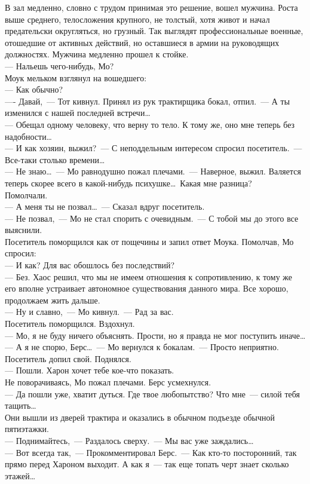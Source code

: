 В зал медленно, словно с трудом принимая это решение, вошел мужчина. Роста выше 
среднего, телосложения крупного, не толстый, хотя живот и начал предательски 
округляться, но грузный. Так выглядят профессиональные военные, отошедшие от 
активных действий, но оставшиеся в армии на руководящих должностях. Мужчина 
медленно прошел к стойке.\\
--- Нальешь чего-нибудь, Мо?\\
Моук мельком взглянул на вошедшего:\\
--- Как обычно?\\
---- Давай,~--- Тот кивнул. Принял из рук трактирщика бокал, отпил.~--- А ты 
изменился с нашей последней встречи\ldots\\
--- Обещал одному человеку, что верну то тело. К тому же, оно мне теперь без 
надобности\ldots\\
--- И как хозяин, выжил?~--- С неподдельным интересом спросил посетитель.~--- 
Все-таки столько времени\ldots\\
--- Не знаю\ldots~--- Мо равнодушно пожал плечами.~--- Наверное, выжил. Валяется 
теперь скорее всего в какой-нибудь психушке\ldots\ Какая мне разница?\\
Помолчали.\\
--- А меня ты не позвал\ldots~--- Сказал вдруг посетитель.\\
--- Не позвал,~--- Мо не стал спорить с очевидным.~--- С тобой мы до этого все 
выяснили.\\
Посетитель поморщился как от пощечины и запил ответ Моука. Помолчав, Мо спросил:\\
--- И как? Для вас обошлось без последствий?\\
--- Без. Хаос решил, что мы не имеем отношения к сопротивлению, к тому же его 
вполне устраивает автономное существования данного мира. Все хорошо, продолжаем 
жить дальше.\\
--- Ну и славно,~--- Мо кивнул.~--- Рад за вас.\\
Посетитель поморщился. Вздохнул.\\
--- Мо, я не буду ничего объяснять. Прости, но я правда не мог поступить 
иначе\ldots\\
--- А я не спорю, Берс\ldots~--- Мо вернулся к бокалам.~--- Просто неприятно.\\
Посетитель допил свой. Поднялся.\\
--- Пошли. Харон хочет тебе кое-что показать.\\
Не поворачиваясь, Мо пожал плечами. Берс усмехнулся.\\
--- Да пошли уже, хватит дуться. Где твое любопытство? Что мне~--- силой тебя 
тащить\ldots\\
Они вышли из дверей трактира и оказались в обычном подъезде обычной пятиэтажки. \\
--- Поднимайтесь,~--- Раздалось сверху.~--- Мы вас уже заждались\ldots\\
--- Вот всегда так,~--- Прокомментировал Берс.~--- Как кто-то посторонний, так 
прямо перед Хароном выходит. А как я~--- так еще топать черт знает сколько 
этажей\ldots\\

